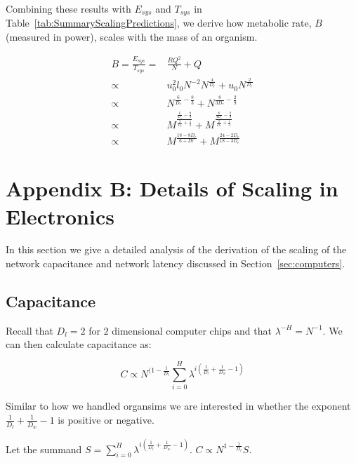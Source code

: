 \documentclass[12pt]{article}
\begin{document}
Combining these results with $E_{sys}$ and $T_{sys}$ in
Table~\ref{tab:SummaryScalingPredictions}, we derive how metabolic rate, $B$
(measured in power), scales with the mass of an organism.

\begin{align*}
B = \frac{E_{sys}}{T_{sys}} =& \frac{RQ^2}{N} + Q \\
 \propto & u_0^2 l_0 N^{-2} N^{\frac{4}{D_r}} + u_0 N^{\frac{2}{D_r}} \\
 \propto & N^{\frac{6}{D_r}- \frac{8}{3}} + N^{\frac{8}{3 D_r} - \frac{2}{9}} \\
 \propto & M^{\frac{\frac{6}{D_r} - \frac{8}{3}}{\frac{2}{D_r} + \frac{1}{3}}}
 + M^{\frac{\frac{8}{3D_r} - \frac{2}{9}}{\frac{2}{D_r} + \frac{1}{3}} } \\
 \propto & M^{\frac{18-8D_r}{6+Dr}} + M^{\frac{24-2D_r}{18-3D_r}} 
\end{align*}

\section{Appendix B: Details of Scaling in Electronics}
\label{sec:AppendixChips}

In this section we give a detailed analysis of the derivation of the scaling of
the network capacitance and network latency discussed in
Section~\ref{sec:computers}.

\subsection{Capacitance}

Recall that $D_l = 2$ for $2$ dimensional computer
chips and that $\lambda^{-H}=N^{-1}$. We can then calculate capacitance as:

\begin{equation}
  C \propto  N^{(1- \frac{1}{D_l}} \sum_{i=0}^H \lambda^{i \left( 
\frac{1}{D_l} + \frac{1}{D_w} -1 \right)}
\end{equation}

Similar to how we handled organsims we are interested in whether the exponent
$\frac{1}{D_l} + \frac{1}{D_w} -1$ is positive or negative.

Let the summand $S = \sum_{i=0}^H \lambda^{i(\frac{1}{D_l} +
\frac{1}{D_w}-1)}$. $C \propto
N^{1-\frac{1}{D_l}} S$. 
\end{document}
